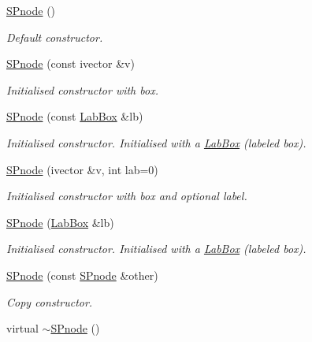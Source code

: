 \begin{DoxyCompactItemize}
\item 
\hyperlink{classsubpavings_1_1SPnode_a7a1699938bb9acff0c04b07be9d64e54}{\-S\-Pnode} ()
\begin{DoxyCompactList}\small\item\em \-Default constructor. \end{DoxyCompactList}\item 
\hyperlink{classsubpavings_1_1SPnode_ad43955b79e832489150c70b6aa4e3f05}{\-S\-Pnode} (const ivector \&v)
\begin{DoxyCompactList}\small\item\em \-Initialised constructor with box. \end{DoxyCompactList}\item 
\hyperlink{classsubpavings_1_1SPnode_acd1241250563fcabfd1fc1d069e2065d}{\-S\-Pnode} (const \hyperlink{classLabBox}{\-Lab\-Box} \&lb)
\begin{DoxyCompactList}\small\item\em \-Initialised constructor. \-Initialised with a \hyperlink{classLabBox}{\-Lab\-Box} (labeled box). \end{DoxyCompactList}\item 
\hyperlink{classsubpavings_1_1SPnode_a7a41d88bc0857db595850fd2c7f1a4fa}{\-S\-Pnode} (ivector \&v, int lab=0)
\begin{DoxyCompactList}\small\item\em \-Initialised constructor with box and optional label. \end{DoxyCompactList}\item 
\hyperlink{classsubpavings_1_1SPnode_ac91f261853f289d2ccf7102cd543a0d4}{\-S\-Pnode} (\hyperlink{classLabBox}{\-Lab\-Box} \&lb)
\begin{DoxyCompactList}\small\item\em \-Initialised constructor. \-Initialised with a \hyperlink{classLabBox}{\-Lab\-Box} (labeled box). \end{DoxyCompactList}\item 
\hyperlink{classsubpavings_1_1SPnode_aeafa6189ea2d85037ab6579471a947be}{\-S\-Pnode} (const \hyperlink{classsubpavings_1_1SPnode}{\-S\-Pnode} \&other)
\begin{DoxyCompactList}\small\item\em \-Copy constructor. \end{DoxyCompactList}\item 
virtual \hyperlink{classsubpavings_1_1SPnode_a87d58ed9b7f89215203195f933533aef}{$\sim$\-S\-Pnode} ()

\end{DoxyCompactItemize}
